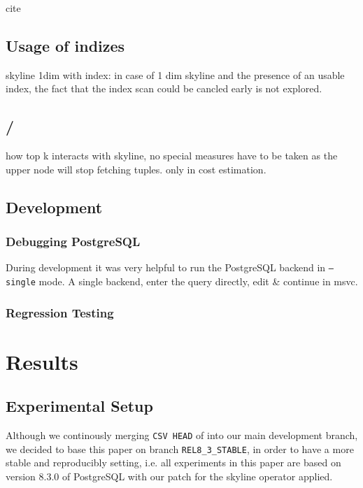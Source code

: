cite \citep{Buchta1989}

\section{Usage of indizes}
skyline 1dim with index: in case of 1 dim skyline and the presence of
an usable index, the fact that the index scan could be cancled early
is not explored.

\section{ / }
how top k interacts with skyline, no special measures have to be taken
as the upper node will stop fetching tuples. only in cost estimation.


\section{Development}
\subsection{Debugging PostgreSQL}
During development it was very helpful to run the PostgreSQL backend
in \texttt{--single} mode. A single backend, enter the query directly,
edit \& continue in msvc.


\subsection{Regression Testing}

\chapter{Results}
\label{chap:Results}


\section{Experimental Setup}

Although we continously merging \texttt{CSV HEAD} of  into our main development branch, we decided
to base this paper on branch \texttt{REL8\_3\_STABLE}, in order to
have a more stable and reproducibly setting, i.e. all experiments in
this paper are based on version 8.3.0 of PostgreSQL with our patch for
the skyline operator applied.

